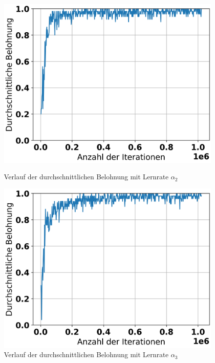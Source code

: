 \begin{figure}[H]
	\begin{minipage}[c]{0.48\linewidth}
		\includegraphics[width=\linewidth]{Bilder/random-training/history_random_0_0005_graph_episode_rewards.png}
		\caption{Verlauf der durchschnittlichen Belohnung mit Lernrate $\alpha_2$}
	\end{minipage}
	\hfill
	\begin{minipage}[c]{0.48\linewidth}
		\includegraphics[width=\linewidth]{Bilder/random-training/history_random_0_0001_graph_episode_rewards.png}
		\caption{Verlauf der durchschnittlichen Belohnung mit Lernrate $\alpha_3$}
	\end{minipage}
\end{figure}


